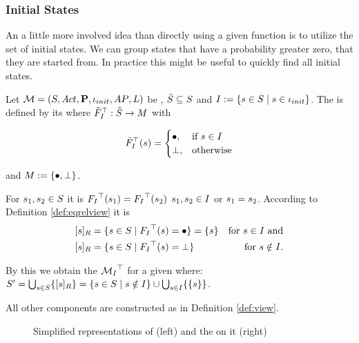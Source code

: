\documentclass[preview]{standalone}
\begin{document}
\subsubsection{Initial States}
An a little more involved idea than directly using a given function is to utilize the set of initial states. We can group states that have a probability greater zero, that they are started from. In practice this might be useful to quickly find all initial states.

\begin{definition}
	Let ${{{\mathcal{M}}}} = {{({S}, {Act}, {\textbf{P}}, {\iota_{init}}, {AP}, {L})}}$ be \achgphN, ${\tilde{{S}}} \subseteq {S}$ and ${I} := \{{s} \in {S} \mid {s} \in {\ensuremath{{\iota_{init}}}}\}$. The \viewN \viewinitstates is defined by its \grpfctN \gfctinitstates where ${{\tilde{F}_{{{I}}}}^{\top}} : {\tilde{{S}}} \to {\ensuremath{{M}}}$ with 
	
	\[
	{{\tilde{F}_{{{I}}}}^{\top}}({s}) =
	\begin{cases}
			{\bullet},				& \text{if } {s} \in {I} \\
			{\bot},          	& \text{otherwise}
		\end{cases}
	\]
	
	and ${{M}} := {\{{\bullet}, {\bot}\}}$.
\end{definition}

For ${s}_1,{s}_2 \in {S}$ it is ${{F_{{{I}}}}^{\top}}({s}_1) = {{F_{{{I}}}}^{\top}}({s}_2)$ \iffN ${s}_1, {s}_2 \in {I}$ or ${s}_1 = {s}_2$. According to Definition \ref{def:eqrelview} it is 
\begin{align*}
	\eqclassv &= \{\state \in \states \mid \gfctinitstates(\state) = \remelem\} = \{\state\} &\text{for } \state \in \initstates \text{ and} \\
	\eqclassv &= \{\state \in \states \mid \gfctinitstates(\state) = \notppty \}  &\text{for } \state \notin \initstates.
\end{align*}


By this we obtain the \viewN ${{{{{\mathcal{M}}}}_{{{I}}}}^{\top}}$ for a given \achgphN \chgph where: ${S}' = \bigcup_{{s} \in {S}} \{{{[{s}]_{{R}}}}\} = \{{s} \in {S} \mid {s} \notin {I}\}\cup \bigcup_{{s} \in {I}}\{\{{s}\}\}$.

All other components are constructed as in Definition \ref{def:view}.

\begin{figure}[h]
	\begin{minipage}{.5\textwidth}
		\hspace{5mm}
		
	\end{minipage}%
	\begin{minipage}{.5\textwidth}
		
	\end{minipage}
	\caption{Simplified representations of \mdp (left) and the \viewN \viewinitstates on it (right)}
	\label{fig:initStatesExmp}  
\end{figure}
\end{document}
